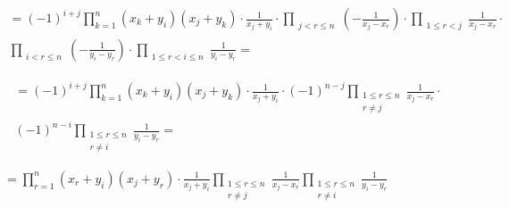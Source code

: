 \documentclass{article}
\begin{document}
\begin{multline*}
= {(-1)}^{i+j} \prod_{k=1}^{n}(x_{k} + y_{i})(x_{j}+y_{k}) \cdot \frac{1}{x_{j}+y_{i}} \cdot \prod_{\substack{j < r \leq n}} (-\frac{1}{x_{j}-x_{r}}) \cdot \prod_{\substack{1 \leq r < j}} \frac{1}{x_{j}-x_{r}} \cdot \\
\prod_{\substack{i < r \leq n}} (-\frac{1}{y_{i}-y_{r}}) \cdot \prod_{\substack{1 \leq r < i \leq n}} \frac{1}{y_{i}-y_{r}} =
\end{multline*}

\begin{multline*}
= {(-1)}^{i+j} \prod_{k=1}^{n}(x_{k} + y_{i})(x_{j}+y_{k}) \cdot \frac{1}{x_{j}+y_{i}} \cdot {(-1)}^{n-j} \prod_{\substack{1 \leq r \leq n\\ r \neq j}} \frac{1}{x_{j}-x_{r}} \cdot \\
{(-1)}^{n-i} \prod_{\substack{1 \leq r \leq n\\ r \neq i}} \frac{1}{y_{i}-y_{r}} =
\end{multline*}

\( = \prod_{r=1}^{n}(x_{r} + y_{i})(x_{j}+y_{r}) \cdot \frac{1}{x_{j}+y_{i}} \prod_{\substack{1 \leq r \leq n\\ r \neq j}} \frac{1}{x_{j}-x_{r}} \prod_{\substack{1 \leq r \leq n\\ r \neq i}} \frac{1}{y_{i}-y_{r}} \)
\end{document}
